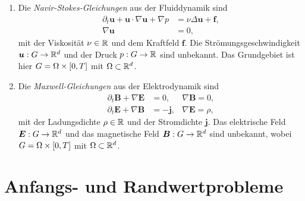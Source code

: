 \documentclass{lecture}
\begin{document}
\begin{example}
\begin{enumerate}
            \item Die \emph{Navir-Stokes-Gleichungen} aus der Fluiddynamik sind
            \begin{align*}
                \partial_t \bm{u} + \bm{u} \cdot \nabla\bm{u} + \nabla p &= \nu\Delta\bm{u} + \bm{f},\\
                \nabla\bm{u} &= 0,
            \end{align*}
            mit der Viskosität \(\nu \in \R\) und dem Kraftfeld \(\bm{f}\).
            Die Strömungsgeschwindigkeit \(\bm{u}: G \to \R^d\) und der Druck \(p: G \to \R\) sind unbekannt.
            Das Grundgebiet ist hier \(G = \Omega \times \brackets*{0, T}\) mit \(\Omega \subset \R^d\).
            \item Die \emph{Maxwell-Gleichungen} aus der Elektrodynamik sind
            \begin{align*}
                \partial_t \bm{B} + \nabla\bm{E} &= 0, & \nabla\bm{B} = 0,\\
                \partial_t \bm{E} + \nabla\bm{B} &= -\bm{j}, & \nabla\bm{E} = \rho,
            \end{align*}
            mit der Ladungsdichte \(\rho \in \R\) und der Stromdichte \(\bm{j}\).
            Das elektrische Feld \(\bm{E}: G \to \R^d\) und das magnetische Feld \(\bm{B}: G \to \R^d\) sind unbekannt, wobei \(G = \Omega \times \brackets*{0, T}\) mit \(\Omega \subset \R^d\).
        \end{enumerate}
    \end{example}


    \section*{Anfangs- und Randwertprobleme}
\end{document}
